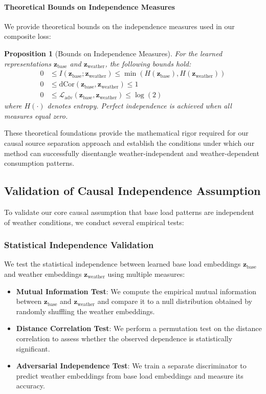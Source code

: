 \documentclass[journal]{IEEEtran}
\newtheorem{proposition}{Proposition}
\begin{document}
\paragraph{Theoretical Bounds on Independence Measures}
We provide theoretical bounds on the independence measures used in our composite loss:

\begin{proposition}[Bounds on Independence Measures]
For the learned representations $\mathbf{z}_{\text{base}}$ and $\mathbf{z}_{\text{weather}}$, the following bounds hold:
\begin{align}
0 &\leq I(\mathbf{z}_{\text{base}}; \mathbf{z}_{\text{weather}}) \leq \min(H(\mathbf{z}_{\text{base}}), H(\mathbf{z}_{\text{weather}})) \\
0 &\leq \text{dCor}(\mathbf{z}_{\text{base}}, \mathbf{z}_{\text{weather}}) \leq 1 \\
0 &\leq \mathcal{L}_{\text{adv}}(\mathbf{z}_{\text{base}}, \mathbf{z}_{\text{weather}}) \leq \log(2)
\end{align}
where $H(\cdot)$ denotes entropy. Perfect independence is achieved when all measures equal zero.
\end{proposition}

These theoretical foundations provide the mathematical rigor required for our causal source separation approach and establish the conditions under which our method can successfully disentangle weather-independent and weather-dependent consumption patterns.

\subsection{Validation of Causal Independence Assumption}
To validate our core causal assumption that base load patterns are independent of weather conditions, we conduct several empirical tests:

\subsubsection{Statistical Independence Validation}
We test the statistical independence between learned base load embeddings $\mathbf{z}_{\text{base}}$ and weather embeddings $\mathbf{z}_{\text{weather}}$ using multiple measures:
\begin{itemize}
    \item \textbf{Mutual Information Test}: We compute the empirical mutual information between $\mathbf{z}_{\text{base}}$ and $\mathbf{z}_{\text{weather}}$ and compare it to a null distribution obtained by randomly shuffling the weather embeddings.
    \item \textbf{Distance Correlation Test}: We perform a permutation test on the distance correlation to assess whether the observed dependence is statistically significant.
    \item \textbf{Adversarial Independence Test}: We train a separate discriminator to predict weather embeddings from base load embeddings and measure its accuracy.
\end{itemize}
\end{document}
